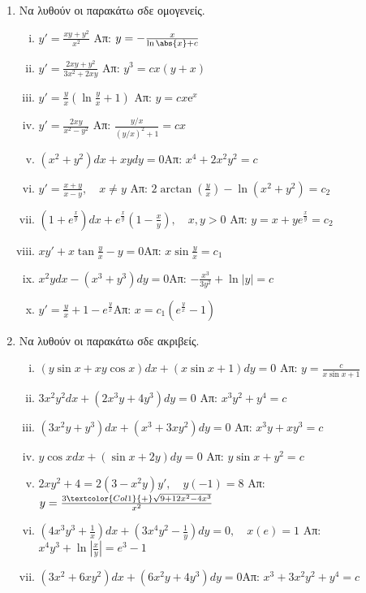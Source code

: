 \begin{enumerate}
    \newpage

  \item Να λυθούν οι παρακάτω σδε ομογενείς.

    \begin{enumerate}[i)]
      \item $ y' = \frac{xy+y^{2}}{x^{2}} $ %
        \hfill Απ: $ y= - \frac{x}{\ln{\abs{x} } + c} $ 
      \item $ y' = \frac{2xy+y^{2}}{3x^{2}+2xy} $ %
        \hfill Απ: $ y^{3}=cx(y+x) $ 
      \item $ y' = \frac{y}{x} (\ln{\frac{y}{x}} +1) $ %
        \hfill Απ: $ y=cx \mathrm{e}^{x} $ 
      \item $ y' = \frac{2xy}{x^{2}-y^{2}} $ %
        \hfill Απ: $ \frac{y/x}{(y/x)^{2}+1} = cx $ 
      \item $(x^2+y^2)dx+xydy=0$\hfill Απ: $x^4+2x^2y^2=c$
      \item $y'=\frac{x+y}{x-y}, \quad x\neq y$
        \hfill Απ: $2\arctan (\frac{y}{x})-\ln (x^2+y^2)=c_2$
      \item $(1+e^{\frac{x}{y}})dx+e^{\frac{x}{y}}(1-\frac{x}{y}), \quad x,y>0$
        \hfill Απ: $y=x+ye^{\frac{x}{y}}=c_2$
      \item $xy'+x\tan \frac{y}{x}-y=0$\hfill Απ: $x\sin \frac{y}{x}=c_1$
      \item $x^2ydx-(x^3+y^3)dy=0$\hfill Απ: $-\frac{x^3}{3y^2}+\ln|y|=c$
      \item $y'=\frac{y}{x}+1-e^{\frac{y}{x}}$\hfill Απ: $x=c_1(e^{\frac{y}{x}}-1)$
    \end{enumerate}

  \item Να λυθούν οι παρακάτω σδε ακριβείς.

    \begin{enumerate}[i)]
      \item $ (y \sin{x} + xy \cos{x})dx + (x \sin{x} +1) dy=0 $ %
        \hfill Απ: $ y= \frac{c}{x \sin{x} +1} $ 
      \item $ 3x^{2}y^{2}dx+(2x^{3}y+4y^{3})dy=0$  %
        \hfill Απ: $ x^{3}y^{2}+y^{4}=c $
      \item $ (3x^{2}y+y^{3})dx+(x^{3}+3xy^{2})dy=0 $ %
        \hfill Απ: $ x^{3}y+xy^{3}=c $
      \item $ y \cos{x} dx + (\sin{x} + 2y)dy=0 $ %
        \hfill Απ: $ y \sin{x} + y^{2}=c $ 
      \item $ 2xy^{2}+4 = 2(3-x^{2}y)y', \quad y(-1)=8 $ %
        \hfill Απ: $ y= \frac{3 \textcolor{Col1}{+} \sqrt{9+12x^{2}-4x^{3}}}{x^{2}} $ 
      \item $(4x^3y^3+\frac{1}{x})dx+(3x^4y^2-\frac{1}{y})dy=0, \quad x(e)=1$
        \hfill Απ: $x^4y^3+\ln |\frac{x}{y}|=e^3-1$
      \item $(3x^2+6xy^2)dx+(6x^2y+4y^3)dy=0$\hfill Απ: $x^3+3x^2y^2+y^4=c$
    \end{enumerate}


\end{enumerate}
